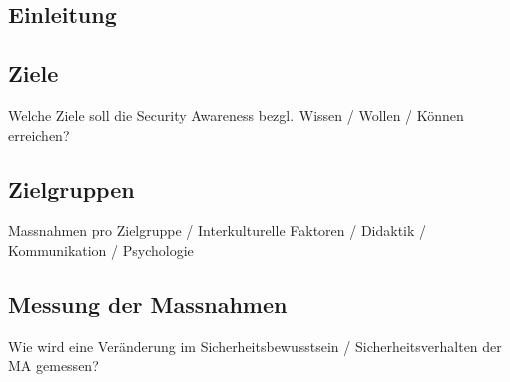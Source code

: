 \documentclass[../../main.tex]{subfiles}
\begin{document}
\subsection{Einleitung}

\subsection{Ziele}
  Welche Ziele soll die Security Awareness bezgl. Wissen / Wollen / Können erreichen? 
\subsection{Zielgruppen}
    Massnahmen pro Zielgruppe / Interkulturelle Faktoren / Didaktik / Kommunikation / Psychologie
\subsection{Messung der Massnahmen}
  Wie wird eine Veränderung im Sicherheitsbewusstsein / Sicherheitsverhalten der MA gemessen?
\end{document}
